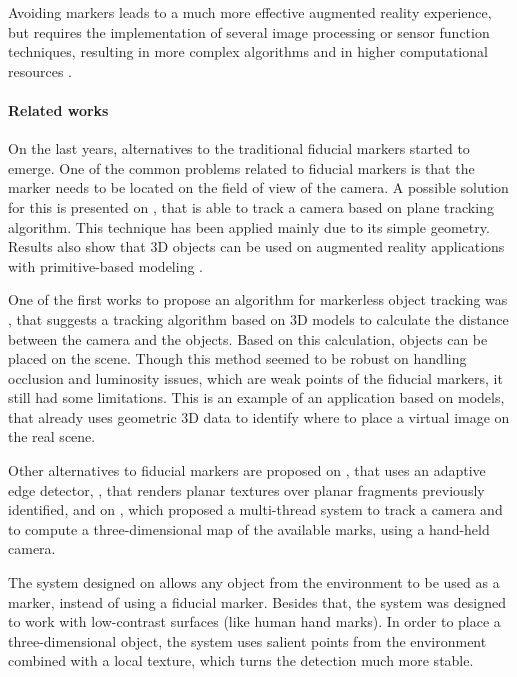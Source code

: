 \documentclass[msc, a4paper, classic, en]{ufbathesis}
\begin{document}
Avoiding markers leads to a much more effective augmented reality experience, but requires the implementation of several image processing or sensor function techniques, resulting in more complex algorithms and in higher computational resources \cite{shumaker2011virtual}.

\paragraph{Related works}

On the last years, alternatives to the traditional fiducial markers started to emerge. One of the common problems related to fiducial markers is that the marker needs to be located on the field of view of the camera. A possible solution for this is presented on \cite{5739718}, that is able to track a camera based on plane tracking algorithm. This technique has been applied mainly due to its simple geometry. Results also show that 3D objects can be used on augmented reality applications with primitive-based modeling \cite{KimLW10}.

One of the first works to propose an algorithm for markerless object tracking was \cite{Comport03d}, that suggests a tracking algorithm based on 3D models to calculate the distance between the camera and the objects. Based on this calculation, objects can be placed on the scene. Though this method seemed to be robust on handling occlusion and luminosity issues, which are weak points of the fiducial markers, it still had some limitations. This is an example of an application based on models, that already uses geometric 3D data to identify where to place a virtual image on the real scene.

Other alternatives to fiducial markers are proposed on \cite{wuest}, that uses an adaptive edge detector, \cite{ferrari}, that renders planar textures over planar fragments previously identified, and on \cite{klein}, which proposed a multi-thread system to track a camera and to compute a three-dimensional map of the available marks, using a hand-held camera.

The system designed on \cite{ZhangL12} allows any object from the environment to be used as a marker, instead of using a fiducial marker. Besides that, the system was designed to work with low-contrast surfaces (like human hand marks). In order to place a three-dimensional object, the system uses salient points from the environment combined with a local texture, which turns the detection much more stable.
\end{document}
